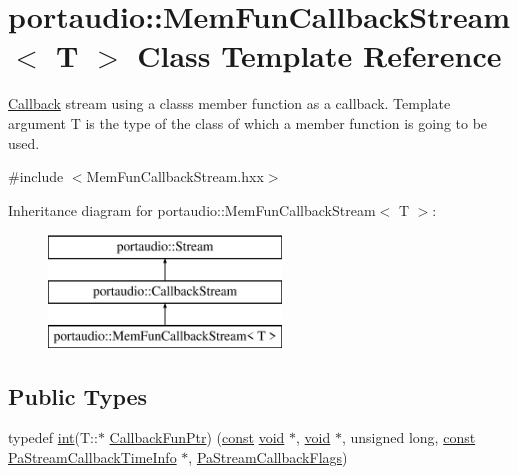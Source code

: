 \hypertarget{classportaudio_1_1_mem_fun_callback_stream}{}\section{portaudio\+:\+:Mem\+Fun\+Callback\+Stream$<$ T $>$ Class Template Reference}
\label{classportaudio_1_1_mem_fun_callback_stream}


\hyperlink{class_callback}{Callback} stream using a class\textquotesingle{}s member function as a callback. Template argument T is the type of the class of which a member function is going to be used.  




{\ttfamily \#include $<$Mem\+Fun\+Callback\+Stream.\+hxx$>$}

Inheritance diagram for portaudio\+:\+:Mem\+Fun\+Callback\+Stream$<$ T $>$\+:\begin{figure}[H]
\begin{center}
\leavevmode
\includegraphics[height=3.000000cm]{classportaudio_1_1_mem_fun_callback_stream}
\end{center}
\end{figure}
\subsection*{Public Types}
\begin{DoxyCompactItemize}
\item 
typedef \hyperlink{xmltok_8h_a5a0d4a5641ce434f1d23533f2b2e6653}{int}(T\+::$\ast$ \hyperlink{classportaudio_1_1_mem_fun_callback_stream_a429144c3e6505f0aebb61df638048027}{Callback\+Fun\+Ptr}) (\hyperlink{getopt1_8c_a2c212835823e3c54a8ab6d95c652660e}{const} \hyperlink{sound_8c_ae35f5844602719cf66324f4de2a658b3}{void} $\ast$, \hyperlink{sound_8c_ae35f5844602719cf66324f4de2a658b3}{void} $\ast$, unsigned long, \hyperlink{getopt1_8c_a2c212835823e3c54a8ab6d95c652660e}{const} \hyperlink{struct_pa_stream_callback_time_info}{Pa\+Stream\+Callback\+Time\+Info} $\ast$, \hyperlink{portaudio_8h_a55a005924bcfa0424594f4f65cd4ae82}{Pa\+Stream\+Callback\+Flags})
\end{DoxyCompactItemize}
